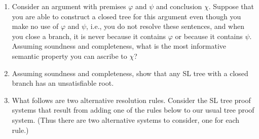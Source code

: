 \documentclass[12pt]{article}
\begin{document}
\begin{enumerate}


\item 
  Consider an argument with premises $\varphi$ and $\psi$ and conclusion $\chi$.
  Suppose that you are able to construct a closed tree for this argument even though you make no use of $\varphi$ and $\psi$, i.e., you do not resolve these sentences, and when you close a branch, it is never because it contains $\varphi$ or because it contains $\psi$.
  Assuming soundness and completeness, what is the most informative semantic property you can ascribe to $\chi$? 



\item Assuming soundness and completeness, show that any SL tree with a closed branch has an unsatisfiable root.
  





\item
What follows are two alternative resolution rules.
Consider the SL tree proof systems that result from adding one of the rules below to our usual tree proof system.
(Thus there are two alternative systems to consider, one for each rule.)


\begin{multicols}{2}


\end{multicols}
\end{enumerate}
\end{document}
